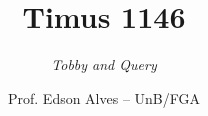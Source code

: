 \title{Timus 1146}
\subtitle{\textit{Tobby and Query}}
\author{Prof. Edson Alves -- UnB/FGA}
\date{}
